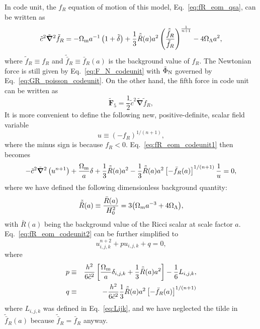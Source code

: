 In code unit, the $f_R$ equation of motion of this model, Eq.~\eqref{eq:fR_eom_qsa}, can be written as
\begin{equation}
\label{eq:fR_eom_codeunit1}\tilde{c}^2\tilde{\boldsymbol{\nabla}}^2\tilde{f}_R = -\Omega_{\rm m}{a}^{-1}\left(1+\tilde{\delta}\right) + \frac{1}{3} \tilde{\bar{R}}(a) a^2 \left(\frac{\tilde{\bar{f}}_{R}}{\tilde{f}_R}\right)^{\frac{1}{n+1}} - 4\Omega_\Lambda a^2,
\end{equation}
where $\tilde{f}_R \equiv f_R$ and $\tilde{\bar{f}}_R\equiv\bar{f}_R(a)$ is the background value of $f_R$. 
The Newtonian force is still given by Eq.~\eqref{eq:F_N_codeunit} with $\tilde{\Phi}_{\rm N}$ governed by Eq.~\eqref{eq:GR_poisson_codeunit}. On the other hand, the fifth force in code unit can be written as
\begin{equation}\label{eq:F5_fR_codeunit}
\tilde{\boldsymbol{F}}_5 = \frac{1}{2}\tilde{c}^2\tilde{\boldsymbol{\nabla}}\tilde{f}_R,
\end{equation}
It is more convenient to define the following new, positive-definite, scalar field variable \cite{Bose:2016wms}
\begin{equation}\label{eq:fR_u}
    u \equiv (-{f}_R)^{1/(n+1)},
\end{equation}
where the minus sign is because $f_R<0$. Eq.~\eqref{eq:fR_eom_codeunit1} then becomes
\begin{equation}\label{eq:fR_eom_codeunit2}
    -\tilde{c}^2\tilde{\boldsymbol{\nabla}}^2\left(u^{n+1}\right) + \frac{\Omega_{\rm m}}{a}\delta + \frac{1}{3}\tilde{\bar{R}}(a)a^2  - \frac{1}{3} \tilde{\bar{R}}(a)a^2\left[-\bar{f}_R (a)\right]^{1/(n+1)}\frac{1}{u} = 0,
\end{equation}
where we have defined the following dimensionless background quantity:
\begin{equation}
    \tilde{\bar{R}}(a) \equiv \frac{\bar{R}(a)}{H_0^2} = 3 \qty(\Omega_{m} a^{-3} + 4\Omega_\Lambda),
\end{equation}
with $\bar{R}(a)$ being the background value of the Ricci scalar at scale factor $a$. Eq.~\eqref{eq:fR_eom_codeunit2} can be further simplified to
\begin{equation}\label{eq:fR_eom_codeunit}
    u^{n+2}_{i,j,k} + p u_{i,j,k} + q = 0,
\end{equation}
where 
\begin{eqnarray}
    p &\equiv& \frac{h^2}{6 \tilde{c}^2}\left[\frac{\Omega_{\rm m}}{a}\delta_{i,j,k} + \frac{1}{3} \tilde{\bar{R}}(a)a^2\right] - \frac{1}{6}L_{i,j,k},\\
    q &\equiv& -\frac{h^2}{6\tilde{c}^2}\frac{1}{3} \tilde{\bar{R}}(a)a^2\left[-\bar{f}_R(a)\right]^{1/(n+1)}
\end{eqnarray}
where $L_{i,j,k}$ was defined in Eq.~\eqref{eq:Lijk}, and we have neglected the tilde in $\tilde{\bar{f}}_R(a)$ because $\tilde{\bar{f}}_R=\bar{f}_R$ anyway.

